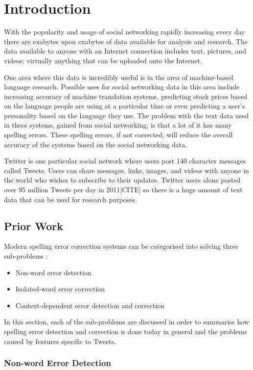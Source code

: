 \chapter{Introduction}
With the popularity and usage of social networking rapidly increasing every day there are exabytes upon exabytes of data available for analysis and research. The data available to anyone with an Internet connection includes text, pictures, and videos; virtually anything that can be uploaded onto the Internet.

One area where this data is incredibly useful is in the area of machine-based language research. Possible uses for social networking data in this area include increasing accuracy of machine translation systems, predicting stock prices based on the language people are using at a particular time or even predicting a user's personality based on the language they use. The problem with the text data used in these systems, gained from social networking, is that a lot of it has many spelling errors. These spelling errors, if not corrected, will reduce the overall accuracy of the systems based on the social networking data.

Twitter is one particular social network where users post 140 character messages called Tweets. Users can share messages, links, images, and videos with anyone in the world who wishes to subscribe to their updates. Twitter users alone posted over 95 million Tweets per day in 2011[CITE] so there is a huge amount of text data that can be used for research purposes.

\section{Prior Work}
Modern spelling error correction systems can be categorised into solving three sub-problems \cite{Kukich1992}:

\begin{itemize}
\item
Non-word error detection
\item
Isolated-word error correction
\item
Context-dependent error detection and correction
\end{itemize}

In this section, each of the sub-problems are discussed in order to summarise how spelling error detection and correction is done today in general and the problems caused by features specific to Tweets.

\subsection{Non-word Error Detection}

